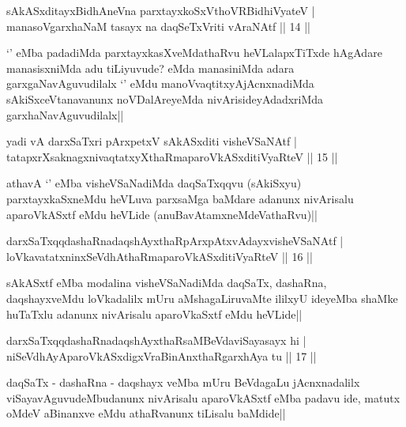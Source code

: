 
\begin{shl}
sAkASxditayxBidhAneVna parxtayxkoSxV\s thoVR\s BidhiVyateV |\\
manasoV\s garxhaNaM tasayx na daqSeTxVriti vAraNAtf \hfill || 14 ||
\end{shl}

\begin{artha}
`\stext' eMba padadiMda parxtayxkasXveMdathaRvu heVLalapxTiTxde hAgAdare manasisxniMda adu tiLiyuvude? eMda manasiniMda adara garxgaNavAguvudilalx `\stext' eMdu manoVvaqtitxyAjAcnxnadiMda sAkiSxceVtanavanunx noVDalAreyeMda nivArisideyAdadxriMda garxhaNavAguvudilalx||
\end{artha}


\begin{shl}
yadi vA darxSaTxri pArxpetxV sAkASxditi visheVSaNAtf |\\
tatapxrXsaknagxnivaqtatxyXthaRmaparoVkASxditiVyaRteV \hfill || 15 ||
\end{shl}

\begin{artha}
athavA `\stext' eMba visheVSaNadiMda daqSaTxqqvu (sAkiSxyu) parxtayxkaSxneMdu heVLuva parxsaMga baMdare adanunx nivArisalu aparoVkASxtf eMdu heVLide (anuBavAtamxneMdeVathaRvu)||
\end{artha}


\begin{shl}
darxSaTxqqdashaRnadaqshAyxthaRpArxpAtxvAdayxvisheVSaNAtf |\\
loVkavatatxninxSeVdhAthaRmaparoVkASxditiVyaRteV \hfill || 16 ||
\end{shl}

\begin{artha}
sAkASxtf eMba modalina visheVSaNadiMda daqSaTx, dashaRna, daqshayxveMdu loVkadalilx mUru aMshagaLiruvaMte ililxyU ideyeMba shaMke huTaTxlu adanunx nivArisalu aparoVkaSxtf eMdu heVLide||
\end{artha}

\begin{shl}
darxSaTxqqdashaRnadaqshAyxthaRsaMBeVdaviSayasayx hi |\\
niSeVdhAyAparoVkASxdigxVraBinAnxthaRgarxhAya tu \hfill || 17 ||
\end{shl}

\begin{artha}
daqSaTx - dashaRna - daqshayx veMba mUru BeVdagaLu jAcnxnadalilx  viSayavAguvudeMbudanunx nivArisalu aparoVkASxtf eMba padavu ide, matutx oMdeV aBinanxve eMdu athaRvanunx tiLisalu baMdide||
\end{artha}

